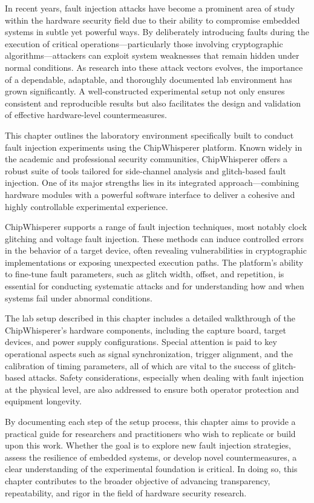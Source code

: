  In recent years, fault injection attacks have become a prominent area of study within the hardware security field due to their ability to compromise embedded systems in subtle yet powerful ways. By deliberately introducing faults during the execution of critical operations—particularly those involving cryptographic algorithms—attackers can exploit system weaknesses that remain hidden under normal conditions. As research into these attack vectors evolves, the importance of a dependable, adaptable, and thoroughly documented lab environment has grown significantly. A well-constructed experimental setup not only ensures consistent and reproducible results but also facilitates the design and validation of effective hardware-level countermeasures.

 This chapter outlines the laboratory environment specifically built to conduct fault injection experiments using the ChipWhisperer platform. Known widely in the academic and professional security communities, ChipWhisperer offers a robust suite of tools tailored for side-channel analysis and glitch-based fault injection. One of its major strengths lies in its integrated approach—combining hardware modules with a powerful software interface to deliver a cohesive and highly controllable experimental experience.
 
 ChipWhisperer \cite{chipwhisperer2025} supports a range of fault injection techniques, most notably clock glitching and voltage fault injection. These methods can induce controlled errors in the behavior of a target device, often revealing vulnerabilities in cryptographic implementations or exposing unexpected execution paths. The platform’s ability to fine-tune fault parameters, such as glitch width, offset, and repetition, is essential for conducting systematic attacks and for understanding how and when systems fail under abnormal conditions.
 
 The lab setup described in this chapter includes a detailed walkthrough of the ChipWhisperer’s hardware components, including the capture board, target devices, and power supply configurations. Special attention is paid to key operational aspects such as signal synchronization, trigger alignment, and the calibration of timing parameters, all of which are vital to the success of glitch-based attacks. Safety considerations, especially when dealing with fault injection at the physical level, are also addressed to ensure both operator protection and equipment longevity.
 
 By documenting each step of the setup process, this chapter aims to provide a practical guide for researchers and practitioners who wish to replicate or build upon this work. Whether the goal is to explore new fault injection strategies, assess the resilience of embedded systems, or develop novel countermeasures, a clear understanding of the experimental foundation is critical. In doing so, this chapter contributes to the broader objective of advancing transparency, repeatability, and rigor in the field of hardware security research.
